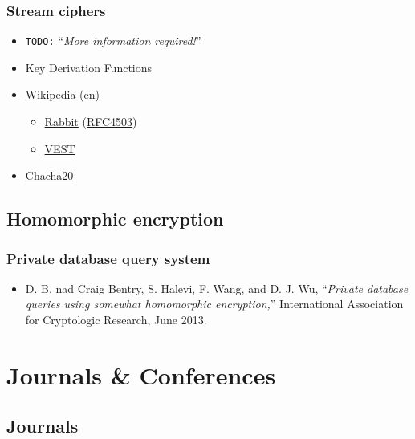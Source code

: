 \documentclass{beamer}
\newcommand{\todo}[1]{\texttt{\color{red}TODO:} ``\emph{#1}''}
\begin{document}
\begin{frame}
\frametitle{Stream ciphers}
    \begin{itemize}
        \item \todo{More information required!}
        \item Key Derivation Functions
        \item \href{http://en.wikipedia.org/wiki/Stream_cipher\#Comparison_Of_Stream_Ciphers}{Wikipedia (en)}
        \begin{itemize}
            \item \href{http://en.wikipedia.org/wiki/Rabbit_(cipher)}{Rabbit} (\href{http://tools.ietf.org/html/rfc4503}{RFC4503})
            \item \href{http://en.wikipedia.org/wiki/VEST}{VEST}
        \end{itemize}
        \item \href{http://godoc.org/github.com/codahale/chacha20}{Chacha20}
     \end{itemize}
\end{frame}

\subsection{Homomorphic encryption}

\begin{frame}
\frametitle{Private database query system}
    \begin{itemize}
        \item D. B. nad Craig Bentry, S. Halevi, F. Wang, and D. J. Wu, ``\emph{Private database queries using somewhat homomorphic encryption,}'' International Association for Cryptologic Research, June 2013.
    \end{itemize}
\end{frame}

\section{Journals \& Conferences}

\subsection{Journals}
\end{document}
